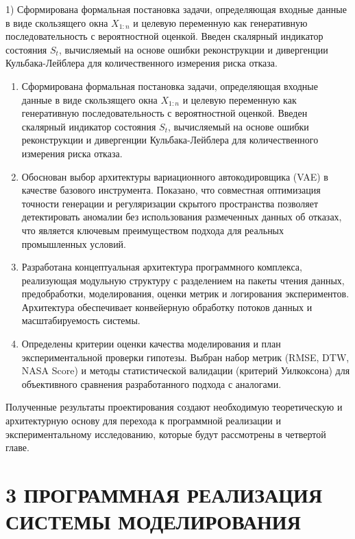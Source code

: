 \documentclass[14pt, a4paper, oneside]{extreport}
\begin{document}
1) Сформирована формальная постановка задачи, определяющая входные данные в виде скользящего окна $X_{1:n}$ и целевую переменную как генеративную последовательность с вероятностной оценкой. Введен скалярный индикатор состояния $S_t$, вычисляемый на основе ошибки реконструкции и дивергенции Кульбака-Лейблера для количественного измерения риска отказа.
\begin{enumerate}
\item Сформирована формальная постановка задачи, определяющая входные данные в виде скользящего окна $X_{1:n}$ и целевую переменную как генеративную последовательность с вероятностной оценкой. Введен скалярный индикатор состояния $S_t$, вычисляемый на основе ошибки реконструкции и дивергенции Кульбака-Лейблера для количественного измерения риска отказа.

\item Обоснован выбор архитектуры вариационного автокодировщика (VAE) в качестве базового инструмента. Показано, что совместная оптимизация точности генерации и регуляризации скрытого пространства позволяет детектировать аномалии без использования размеченных данных об отказах, что является ключевым преимуществом подхода для реальных промышленных условий.

\item Разработана концептуальная архитектура программного комплекса, реализующая модульную структуру с разделением на пакеты чтения данных, предобработки, моделирования, оценки метрик и логирования экспериментов. Архитектура обеспечивает конвейерную обработку потоков данных и масштабируемость системы.

\item Определены критерии оценки качества моделирования и план экспериментальной проверки гипотезы. Выбран набор метрик (RMSE, DTW, NASA Score) и методы статистической валидации (критерий Уилкоксона) для объективного сравнения разработанного подхода с аналогами.
\end{enumerate}

Полученные результаты проектирования создают необходимую теоретическую и архитектурную основу для перехода к программной реализации и экспериментальному исследованию, которые будут рассмотрены в четвертой главе.

\clearpage



\section{3 ПРОГРАММНАЯ РЕАЛИЗАЦИЯ СИСТЕМЫ МОДЕЛИРОВАНИЯ}
\end{document}
